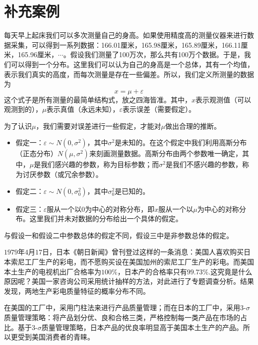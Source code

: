 \section{补充案例}

\begin{example}[（测量）]
    每天早上起床我们可以多次测量自己的身高。如果使用精度高的测量仪器来进行数据采集，可以得到一系列数据：166.01厘米，165.98厘米，165.89厘米，166.11厘米，165.96厘米，$\cdots$。假设我们测量了100万次，那么共有100万个数据。于是，我们可以得到一个分布。这里我们可以认为自己的身高是一个总体，其有一个均值，表示我们真实的高度，而每次测量是存在一些偏差。所以，我们定义所测量的数据为
    $$
    x = \mu + \varepsilon
    $$
    这个式子是所有测量的最简单结构式，放之四海皆准。其中，$x$表示观测值（可以观测到的），$\mu$表示真值（永远未知），$\varepsilon$表示误差（需要假定）。

    为了认识$\mu$，我们需要对误差进行一些假定，才能对$\mu$做出合理的推断。
    \begin{itemize}
        \item 假定一：$\varepsilon \sim N(0,\sigma^{2})$，其中$\sigma^{2}$是未知的。在这个假定中我们利用高斯分布（正态分布）$ N(\mu,\sigma^{2})$来刻画测量数据。高斯分布由两个参数唯一确定，其中，$\mu$是我们感兴趣的参数，称为目标参数；而$\sigma^{2}$是我们不感兴趣的参数，称为讨厌参数（或冗余参数）。
        \item 假定二：$\varepsilon \sim N(0,\sigma^{2}_0)$，其中$\sigma^{2}_0$是已知的。
        \item 假定三：$\varepsilon$服从一个以$0$为中心的对称分布，即$x$服从一个以$\mu$为中心的对称分布。这里我们并未对数据的分布给出一个具体的假定。 
    \end{itemize}
\end{example}
\begin{remark}
    与假设一和假设二中参数总体的假定不同，假设三中是非参数总体的假定。
\end{remark}

\begin{example}
    $1979$年$4$月$17$日，日本《朝日新闻》曾刊登过这样的一条消息：美国人喜欢购买日本索尼工厂生产的彩电，而不愿购买设在美国加州的索尼工厂生产的彩电。而美国本土生产的电视机出厂合格率为$100\%$，日本产的合格率只有$99.73\%$.这究竟是什么原因呢？美国一家咨询公司采用统计抽样的方法，对此进行了专题调查分析。结果发现，两地生产彩电质量特征的概率分布不同。

    在美国的工厂中，采用门柱法来进行产品质量管理；而在日本的工厂中，采用$3$-$\sigma$质量管理策略：将产品划分优、良和合格三类，严格控制每一类产品在市场的占比。基于$3$-$\sigma$质量管理策略，日本产品的优良率明显高于美国本土生产的产品。所以更受到美国消费者的青睐。
\end{example}
